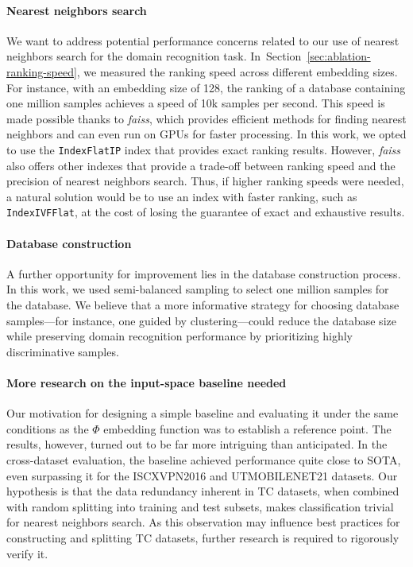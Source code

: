 \documentclass[lettersize,journal,twoside,article]{IEEEtran}
\newcommand{\secref}[1]{Section~\ref{#1}}
\begin{document}
\paragraph*{Nearest neighbors search}
We want to address potential performance concerns related to our use of nearest neighbors search for the domain recognition task. In~\secref{sec:ablation-ranking-speed}, we measured the ranking speed across different embedding sizes. For instance, with an embedding size of 128, the ranking of a database containing one million samples achieves a speed of 10k samples per second. This speed is made possible thanks to \textit{faiss}, which provides efficient methods for finding nearest neighbors and can even run on GPUs for faster processing. In this work, we opted to use the \texttt{IndexFlatIP} index that provides exact ranking results. However, \textit{faiss} also offers other indexes that provide a trade-off between ranking speed and the precision of nearest neighbors search. Thus, if higher ranking speeds were needed, a natural solution would be to use an index with faster ranking, such as \texttt{IndexIVFFlat}\footnotemark, at the cost of losing the guarantee of exact and exhaustive results. 

\paragraph*{Database construction}
A further opportunity for improvement lies in the database construction process. In this work, we used semi-balanced sampling to select one million samples for the database. We believe that a more informative strategy for choosing database samples---for instance, one guided by clustering---could reduce the database size while preserving domain recognition performance by prioritizing highly discriminative samples.

\paragraph*{More research on the input-space baseline needed}
Our motivation for designing a simple baseline and evaluating it under the same conditions as the $\Phi$ embedding function was to establish a reference point. The results, however, turned out to be far more intriguing than anticipated. In the cross-dataset evaluation, the baseline achieved performance quite close to SOTA, even surpassing it for the ISCXVPN2016 and UTMOBILENET21 datasets. Our hypothesis is that the data redundancy inherent in TC datasets, when combined with random splitting into training and test subsets, makes classification trivial for nearest neighbors search. As this observation may influence best practices for constructing and splitting TC datasets, further research is required to rigorously verify it.
\end{document}
